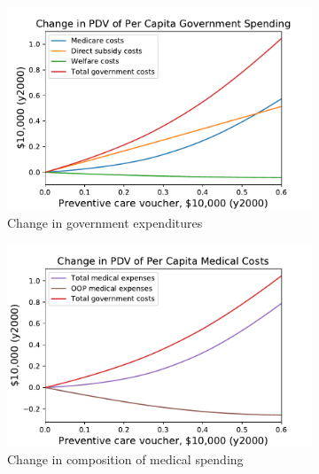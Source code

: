 \documentclass[12pt,pdftex,letterpaper]{article}
\begin{document}
\begin{figure}[h!]
    \centering
    \begin{subfigure}[b]{0.49\textwidth}
        \centering
        \includegraphics[width=\textwidth]{../Figures/PreventiveSubGovtChange.pdf}
        \caption{Change in government expenditures}
    \end{subfigure}
    \begin{subfigure}[b]{0.49\textwidth}
        \centering
        \includegraphics[width=\textwidth]{../Figures/PreventiveSubMedChange.pdf}
        \caption{Change in composition of medical spending}
    \end{subfigure}
    \begin{subfigure}[b]{0.49\textwidth}
        \centering

\end{subfigure}
\end{figure}
\end{document}
